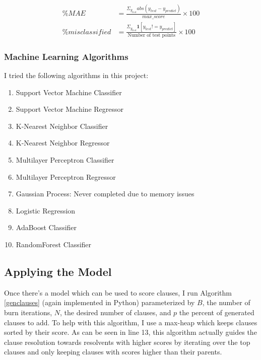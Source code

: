 \documentclass[letterpaper]{article} %
\begin{document}
\begin{equation*}
\begin{split}
\% MAE &= \frac{\Sigma_{y_{test}} abs(y_{test} - y_{predict})}{max\_score} \times 100\\
\% misclassified &= \frac{\Sigma_{y_{test}} \textbf{1}[y_{test} != y_{predict}]}{\text{Number of test points}} \times 100
\end{split}
\end{equation*}

\subsubsection{Machine Learning Algorithms}

I tried the following algorithms in this project:

\begin{enumerate}
\item Support Vector Machine Classifier
\item Support Vector Machine Regressor
\item K-Nearest Neighbor Classifier
\item K-Nearest Neighbor Regressor
\item Multilayer Perceptron Classifier
\item Multilayer Perceptron Regressor
\item Gaussian Process: Never completed due to memory issues
\item Logistic Regression
\item AdaBoost Classifier
\item RandomForest Classifier
\end{enumerate}

\subsection{Applying the Model}

Once there's a model which can be used to score clauses, I run Algorithm \ref{genclauses} (again implemented in Python) parameterized by $B$, the number of burn iterations, $N$, the desired number of clauses, and $p$ the percent of generated clauses to add. To help with this algorithm, I use a max-heap which keeps clauses sorted by their score. As can be seen in line 13, this algorithm actually guides the clause resolution towards resolvents with higher scores by iterating over the top clauses and only keeping clauses with scores higher than their parents.
\end{document}
